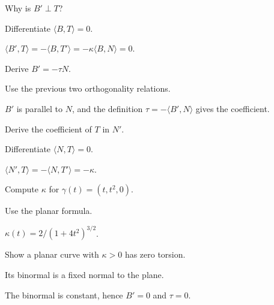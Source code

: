 \begin{exercise}\label{exr:vii13-08}
Why is \(B'\perp T\)?
\end{exercise}
\begin{hint}
Differentiate \(\langle B,T\rangle=0\).
\end{hint}
\begin{solution}
\(\langle B',T\rangle=-\langle B,T'\rangle=-\kappa\langle B,N\rangle=0\).
\end{solution}

\begin{exercise}\label{exr:vii13-09}
Derive \(B'=-\tau N\).
\end{exercise}
\begin{hint}
Use the previous two orthogonality relations.
\end{hint}
\begin{solution}
\(B'\) is parallel to \(N\), and the definition \(\tau=-\langle B',N\rangle\) gives the coefficient.
\end{solution}

\begin{exercise}\label{exr:vii13-10}
Derive the coefficient of \(T\) in \(N'\).
\end{exercise}
\begin{hint}
Differentiate \(\langle N,T\rangle=0\).
\end{hint}
\begin{solution}
\(\langle N',T\rangle=-\langle N,T'\rangle=-\kappa\).
\end{solution}

\begin{exercise}\label{exr:vii13-11}
Compute \(\kappa\) for \(\gamma(t)=(t,t^2,0)\).
\end{exercise}
\begin{hint}
Use the planar formula.
\end{hint}
\begin{solution}
\(\kappa(t)=2/(1+4t^2)^{3/2}\).
\end{solution}

\begin{exercise}\label{exr:vii13-12}
Show a planar curve with \(\kappa>0\) has zero torsion.
\end{exercise}
\begin{hint}
Its binormal is a fixed normal to the plane.
\end{hint}
\begin{solution}
The binormal is constant, hence \(B'=0\) and \(\tau=0\).
\end{solution}

